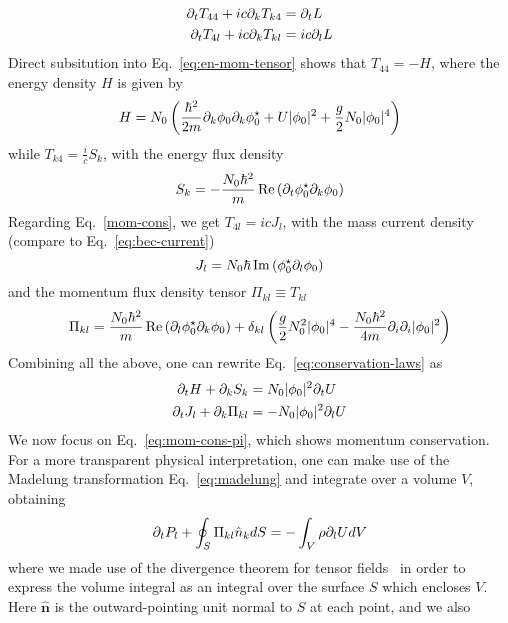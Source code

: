 \begin{subappendices}
%
\begin{align}
  \partial_t T_{4 4} + i c \partial_{k} T_{k 4} & = \partial_t L\label{energy-cons}\\
  \partial_t T_{4 l} + i c \partial_{k} T_{k l} & = i c \partial_{l} L\label{mom-cons}
\end{align}
%
Direct subsitution into Eq.~\eqref{eq:en-mom-tensor} shows that
$T_{4 4} = -H$, where the energy density $H$ is given by
%
\begin{equation}\label{eq:en-density}
  H = N_0\left(
\frac{\hbar^2}{2m}\partial_k\phi_{0}\partial_k\phi_{0}^{\star} + U\vert \phi_{0} \vert^2 + \frac{g}{2}N_0\vert \phi_{0} \vert^4 \right)
\end{equation}
% 
while $T_{k 4} = \frac{i}{c}S_k$, with the energy flux density
%
\begin{equation}\label{eq:energy-source}
  S_k = -\frac{N_0\hbar^2}{m}\operatorname{Re}\left(\partial_t\phi_{0}^{\star}\partial_k\phi_{0}\right)
\end{equation}
% 
Regarding Eq.~\eqref{mom-cons}, we get $T_{4 l} = i c J_l$, with the mass
current density (compare to Eq.~\eqref{eq:bec-current})
\begin{equation}\label{eq:current}
  J_l = N_0\hbar\operatorname{Im}\left(\phi_{0}^{\star} \partial_l \phi_{0}\right)
\end{equation}
and the momentum flux density tensor $\Pi_{kl} \equiv T_{kl}$
%
\begin{equation}
  \Pi_{kl} = \frac{N_0\hbar^2}{m}\operatorname{Re}\left(\partial_l\phi_{0}^{\star}\partial_k\phi_{0}\right) + \delta_{kl}\left(\frac{g}{2}N_0^2\vert \phi_{0} \vert^4 -
    \frac{N_0\hbar^2}{4m}\partial_i\partial_i\vert \phi_{0} \vert^2\right)
\end{equation}
% 
Combining all the above, one can rewrite
Eq.~\eqref{eq:conservation-laws} as
%
\begin{align}
  \partial_t H + \partial_{k} S_k & = N_0\vert \phi_{0} \vert^2 \partial_{t} U\\
  \partial_t J_l  + \partial_{k} \Pi_{k l} & = -N_0\vert \phi_{0} \vert^2 \partial_{l} U\label{eq:mom-cons-pi}
\end{align}
%
We now focus on Eq.~\eqref{eq:mom-cons-pi}, which shows momentum
conservation. For a more transparent physical interpretation, one can
make use of the Madelung transformation Eq.~\eqref{eq:madelung} and
integrate over a volume $V$, obtaining
%
\begin{equation}\label{eq:gauss}
  \partial_t P_l  + \oint_S \Pi_{k l} \hat{n}_k d S  = -\int_{V}  \rho \partial_{l} U dV
\end{equation}
% 
where we made use of the divergence theorem for tensor
fields~\cite{the_brick} in order to express the volume integral as an
integral over the surface $S$ which encloses $V$. Here $\bm{\hat{n}}$
is the outward-pointing unit normal to $S$ at each point, and we also

\end{subappendices}
